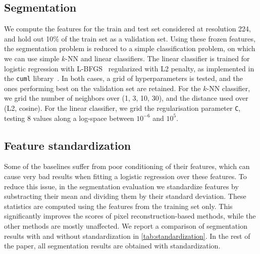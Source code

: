 \subsection{Segmentation}
We compute the features for the train and test set considered at resolution 224, and hold out 10\% of the train set as a validation set.
Using these frozen features, the segmentation problem is reduced to a simple classification problem, on which we can use simple $k$-NN and linear classifiers.
The linear classifier is trained for logistic regression with L-BFGS~\citep{lbfgs} regularized with L2 penalty, as implemented in the \texttt{cuml} library~\citep{cuml}.
In both cases, a grid of hyperparameters is tested, and the ones performing best on the validation set are retained.
For the $k$-NN classifier, we grid the number of neighbors over (1, 3, 10, 30), and the distance used over (L2, cosine).
For the linear classifier, we grid the regularisation parameter \texttt{C}, testing 8 values along a log-space between $10^{-6}$ and $10^5$.

\subsection{Feature standardization}
Some of the baselines suffer from poor conditioning of their features, which can cause very bad results when fitting a logistic regression over these features.
To reduce this issue, in the segmentation evaluation we standardize features by substracting their mean and dividing them by their standard deviation.
These statistics are computed using the features from the training set only.
This significantly improves the scores of pixel reconstruction-based methods, while the other methods are mostly unaffected.
We report a comparison of segmentation results with and without standardization in \cref{tab:standardization}.
In the rest of the paper, all segmentation results are obtained with standardization.

